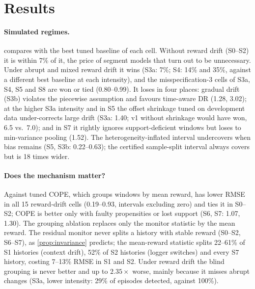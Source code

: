 \section{Results}\label{sec:results}



\paragraph{Simulated regimes.}
 compares \odrift{} with the best tuned baseline of each cell. Without reward drift
(S0--S2) it is within 7\% of it, the price of segment models that turn out to be unnecessary.
Under abrupt and mixed reward drift it wins (S3a: 7\%; S4: 14\% and 35\%, against a different
best baseline at each intensity), and the misspecification-3 cells of S3a, S4, S5 and S8 are won or
tied (0.80--0.99). It loses in four places: gradual drift (S3b) violates the piecewise assumption
and favours time-aware DR (1.28, 3.02); at the higher S3a intensity and in S5 the offset shrinkage
tuned on development data under-corrects large drift (S3a: 1.40; v1 without shrinkage would have
won, 6.5 vs.\ 7.0); and in S7 it rightly ignores support-deficient windows but loses to
min-variance pooling (1.52). The heterogeneity-inflated interval undercovers when bias remains
(S5, S3b: 0.22--0.63); the certified sample-split interval always covers but is 18 times wider.

\paragraph{Does the mechanism matter?}
Against tuned COPE, which groups windows by mean reward, \odrift{} has lower RMSE in all 15
reward-drift cells (0.19--0.93, intervals excluding zero) and ties it in S0--S2; COPE is better
only with faulty propensities or lost support (S6, S7: 1.07, 1.30). The grouping ablation replaces
only the monitor statistic by the mean reward. The residual monitor never splits a history with
stable reward (S0--S2, S6--S7), as \cref{prop:invariance} predicts; the mean-reward statistic splits
22--61\% of S1 histories (context drift), 52\% of S2 histories (logger switches) and every S7
history, costing 7--13\% RMSE in S1 and S2. Under reward drift the blind grouping is never better
and up to $2.35\times$ worse, mainly because it misses abrupt changes (S3a, lower intensity: 29\%
of episodes detected, against 100\%).

